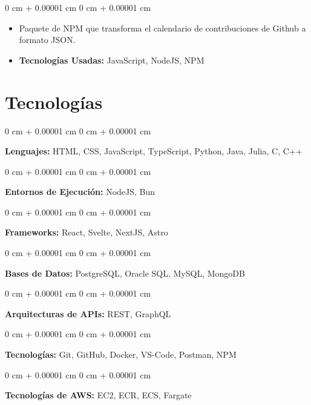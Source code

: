 \documentclass[10pt, letterpaper]{article}
\newenvironment{highlights}{
    \begin{itemize}[
        topsep=0.10 cm,
        parsep=0.10 cm,
        partopsep=0pt,
        itemsep=0pt,
        leftmargin=0 cm + 10pt
    ]
}{
    \end{itemize}
} %
\newenvironment{onecolentry}{
    \begin{adjustwidth}{
        0 cm + 0.00001 cm
    }{
        0 cm + 0.00001 cm
    }
}{
    \end{adjustwidth}
} %
\newlength{\itemSeparate}
\begin{document}
        \vspace{\itemSeparate}
        \begin{onecolentry}
            \begin{highlights}
                \item Paquete de NPM que transforma el calendario de contribuciones de Github a formato JSON.
                \item \textbf{Tecnologías Usadas:} JavaScript, NodeJS, NPM
            \end{highlights}
        \end{onecolentry}

    
    \section{Tecnologías}
        \begin{onecolentry}
            \textbf{Lenguajes:} HTML, CSS, JavaScript, TypeScript, Python, Java, Julia, C, C++
        \end{onecolentry}

        \vspace{\itemSeparate}

        \begin{onecolentry}
            \textbf{Entornos de Ejecución:} NodeJS, Bun
        \end{onecolentry}

        \vspace{\itemSeparate}

        \begin{onecolentry}
            \textbf{Frameworks:} React, Svelte, NextJS, Astro
        \end{onecolentry}

        \vspace{\itemSeparate}

        \begin{onecolentry}
            \textbf{Bases de Datos:} PostgreSQL, Oracle SQL, MySQL, MongoDB
        \end{onecolentry}

        \vspace{\itemSeparate}

        \begin{onecolentry}
            \textbf{Arquitecturas de APIs:} REST, GraphQL
        \end{onecolentry}

        \vspace{\itemSeparate}

        \begin{onecolentry}
            \textbf{Tecnologías:} Git, GitHub, Docker, VS-Code, Postman, NPM
        \end{onecolentry}

        \vspace{\itemSeparate}

        \begin{onecolentry}
            \textbf{Tecnologías de AWS:} EC2, ECR, ECS, Fargate
        \end{onecolentry}
    
    
\end{document}
